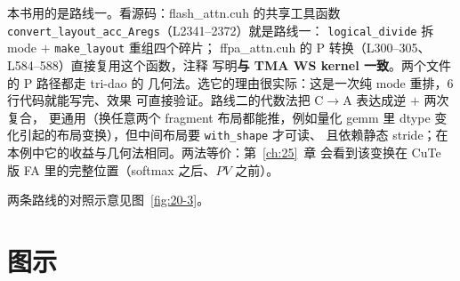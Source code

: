 本书用的是路线一。看源码：flash\_attn.cuh 的共享工具函数
\texttt{convert\_\allowbreak{}layout\_\allowbreak{}acc\_\allowbreak{}Aregs}（L2341--2372）就是路线一：
\texttt{logical\_\allowbreak{}divide} 拆 mode $+$ \texttt{make\_layout} 重组四个碎片；
ffpa\_attn.cuh 的 P 转换（L300--305、L584--588）直接复用这个函数，注释
写明\textbf{与 TMA WS kernel 一致}。两个文件的 P 路径都走 tri-dao 的
几何法。选它的理由很实际：这是一次纯 mode 重排，6 行代码就能写完、效果
可直接验证。路线二的代数法把 C$\to$A 表达成逆 $+$ 两次复合，
更通用（换任意两个 fragment 布局都能推，例如量化 gemm 里
dtype 变化引起的布局变换），但中间布局要 \texttt{with\_shape} 才可读、
且依赖静态 stride；在本例中它的收益与几何法相同。两法等价：第~\ref{ch:25}~章
会看到该变换在 CuTe 版 FA 里的完整位置（softmax 之后、$PV$ 之前）。

两条路线的对照示意见图~\ref{fig:20-3}。

\section{图示}


